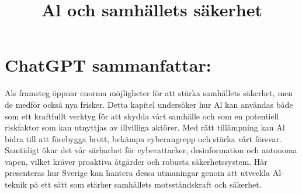 {{{{{{{{\title{
Al och samhällets säkerhet
}
\section*{ChatGPT sammanfattar:}
Als framsteg öppnar enorma möjligheter för att stärka samhällets säkerhet, men de medför också nya frisker.
Detta kapitel undersöker hur Al kan användas både som ett kraftfullt verktyg för att skydda vårt samhälle och som en potentiell riskfaktor som kan utnyttjas av illvilliga aktörer. Med rätt tillämpning kan Al bidra till att förebygga brott, bekämpa cyberangrepp och stärka vårt försvar. Samtidigt ökar det vår särbarhet för cyberattacker, desinformation och autonoma vapen, vilket kräver proaktiva åtgärder och robusta säkerhetssystem. Här presenteras hur Sverige kan hantera dessa utmaningar genom att utveckla Al-teknik på ett sätt som stärker samhällets motsståndskraft och säkerhet.
}}}}}}}}
